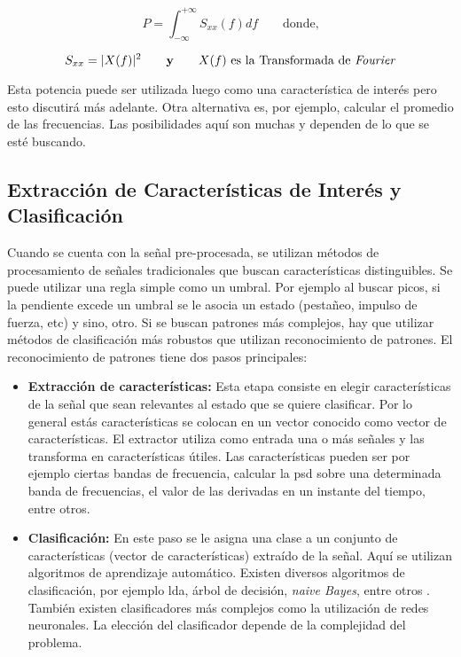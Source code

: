 $$ P = \int_{-\infty}^{+\infty} S_{xx} (f) df \qquad  \textrm{donde,}$$

$$ S_{xx} = |X(f)|^{2} \qquad \textbf{y} \qquad X(f) \textrm{ es la Transformada de \emph{Fourier}} $$

Esta potencia puede ser utilizada luego como una característica de interés pero esto discutirá más adelante. Otra alternativa  es, por ejemplo, calcular el promedio de las frecuencias. Las posibilidades aquí son muchas y dependen de lo que se esté buscando.

\subsection{Extracción de Características de Interés y Clasificación} \label{sec:classification}

Cuando se cuenta con la señal pre-procesada, se utilizan métodos de procesamiento de señales tradicionales que buscan características distinguibles.  Se puede utilizar una regla simple como un umbral. Por ejemplo al buscar picos, si la pendiente excede un umbral se le asocia un estado (pestañeo, impulso de fuerza, etc) y sino, otro. Si se buscan patrones más complejos, hay que utilizar métodos de clasificación más robustos que utilizan reconocimiento de patrones. El reconocimiento de patrones tiene dos pasos principales:

\begin{itemize}
  \item \textbf{Extracción de características:} Esta etapa consiste en elegir características de la señal que sean relevantes al estado que se quiere clasificar. Por lo general estás características se colocan en un vector conocido como vector de características. El extractor utiliza como entrada una o más señales y las transforma en características útiles. Las características pueden ser por ejemplo ciertas bandas de frecuencia, calcular la \acrshort{psd} sobre una determinada banda de frecuencias, el valor de las derivadas en un instante del tiempo, entre otros. 
  \item \textbf{Clasificación:} En este paso se le asigna una clase a un conjunto de características (vector de características) extraído de la señal. Aquí se utilizan algoritmos de aprendizaje automático. Existen diversos algoritmos de clasificación, por ejemplo \gls{lda}, árbol de decisión, \emph{naive Bayes}, entre otros \cite{eeg-tutorial}. También existen clasificadores más complejos como la utilización de redes neuronales. La elección del clasificador depende de la complejidad del problema.
\end{itemize}

